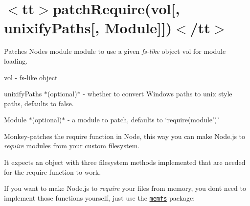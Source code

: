 \chapter{\texorpdfstring{$<$}{<}tt\texorpdfstring{$>$}{>}patch\+Require(vol\mbox{[}, unixify\+Paths\mbox{[}, Module\mbox{]}\mbox{]})\texorpdfstring{$<$}{<}/tt\texorpdfstring{$>$}{>}}
\hypertarget{md_node__modules_2fs-monkey_2docs_2api_2patchRequire}{}\label{md_node__modules_2fs-monkey_2docs_2api_2patchRequire}
\label{md_node__modules_2fs-monkey_2docs_2api_2patchRequire_autotoc_md14330}%
%
 Patches Node\textquotesingle{}s {\ttfamily module} module to use a given {\itshape fs-\/like} object {\ttfamily vol} for module loading.


\begin{DoxyItemize}
\item {\ttfamily vol} -\/ fs-\/like object
\item {\ttfamily unixify\+Paths} \texorpdfstring{$\ast$}{*}(optional)\texorpdfstring{$\ast$}{*} -\/ whether to convert Windows paths to unix style paths, defaults to {\ttfamily false}.
\item {\ttfamily Module} \texorpdfstring{$\ast$}{*}(optional)\texorpdfstring{$\ast$}{*} -\/ a module to patch, defaults to `require(\textquotesingle{}module')\`{}
\end{DoxyItemize}

Monkey-\/patches the {\ttfamily require} function in Node, this way you can make Node.\+js to {\itshape require} modules from your custom filesystem.

It expects an object with three filesystem methods implemented that are needed for the {\ttfamily require} function to work.


\begin{DoxyCode}{0}
\DoxyCodeLine{\};}

\end{DoxyCode}


If you want to make Node.\+js to {\itshape require} your files from memory, you don\textquotesingle{}t need to implement those functions yourself, just use the \href{https://github.com/streamich/memfs}{\texttt{ {\ttfamily memfs}}} package\+:


